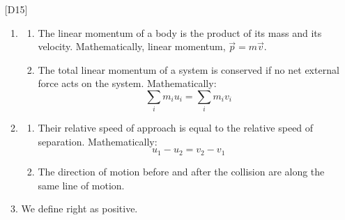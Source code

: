 \documentclass[11pt]{article}
\newcommand{\solution}[1]{\textbf{Solution: } #1 \hspace{5mm}}
\begin{document}
\begin{enumerate}
\begin{enumerate}
			All the momentum of the \SI{1.8}{\kilogram} block and the embedded bullet comes from the momentum of the bullet after it passes through the first block:
			\begin{align*}
				v_{bullet} &= \frac{p}{m_{bullet}} \\
				&= \frac{\left(1.8+3.5\times 10^{-3}\right)\times 1.4}{3.5\times 10^{-3}}\\
				&= \SI{721.4}{\meter\per\second}
			\end{align*}
			\pagebreak
			\item \solution{\SI{937.4}{\meter\per\second}}
			All the momentum of the \SI{1.8}{\kilogram} block, the embedded bullet and the \SI{1.2}{\kilogram} block comes from the original momentum of the bullet:
			\begin{align*}
			u_{bullet} &= \frac{p_{total}}{m_{bullet}} \\
			&= \frac{\left(1.8+3.5\times 10^{-3}\right)(1.4) + 1.2 (0.63)}{3.5\times 10^{-3}}\\
			&= \SI{937.4}{\meter\per\second}
			\end{align*}
		\end{enumerate}
		\item[{[D15]}] 
		\begin{enumerate}
			\item 
			\begin{enumerate}
				\item The linear momentum of a body is the product of its mass and its velocity. Mathematically, linear momentum, $\vec{p} = m\vec{v}$.
				\item The total linear momentum of a system is conserved if no net external force acts on the system. Mathematically:
				\begin{equation}
					\sum_{i} m_{i}u_{i} = \sum_{i} m_{i}v_{i} 
				\end{equation}
			\end{enumerate}
			\item 
			\begin{enumerate}
				\item Their relative speed of approach is equal to the relative speed of separation. Mathematically:
				\begin{equation}
					u_1 - u_2 = v_2 - v_1
				\end{equation}
				\item The direction of motion before and after the collision are along the same line of motion. 
			\end{enumerate}
			\item We define right as positive. 

\end{enumerate}
\end{enumerate}
\end{document}
